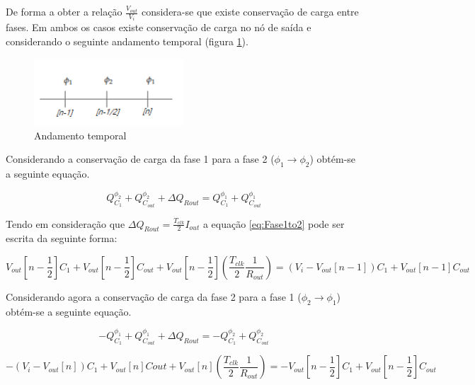 \documentclass[12pt]{article}
\begin{document}
De forma a obter a relação $\frac{V_{out}}{V_i}$ considera-se que existe conservação de carga entre fases. Em ambos os casos existe conservação de carga no nó de saída e considerando o seguinte andamento temporal (figura \ref{fig:Andamento temporal}).

\begin{figure}[h]
	\centering
	\includegraphics[height=2.5cm]{andamentotemporal}
	\caption{Andamento temporal}
	\label{fig:Andamento temporal}
\end{figure}
Considerando a conservação de carga da fase 1 para a fase 2 ($\phi_1 \rightarrow \phi_2$) obtém-se a seguinte equação.
\vspace{5mm}

\begin{equation}
\label{eq:Fase1to2}
Q^{\phi_2}_{C_1} + Q^{\phi_2}_{C_{out}} + \Delta Q_{Rout} = Q^{\phi_1}_{C_1} + Q^{\phi_1}_{C_{out}} 
\end{equation}
\vspace{5mm}

Tendo em consideração que $\Delta Q_{Rout} = \frac{T_{clk} }{2}I_{out}$ a equação \ref{eq:Fase1to2} pode ser escrita da seguinte forma:

\begin{equation}
\label{eq:Fase1to2s}
V_{out}[n-\frac{1}{2}]C_1 + V_{out}[n-\frac{1}{2}]C_{out} +  V_{out}[n-\frac{1}{2}](\frac{T_{clk} }{2}\frac{1}{R_{out}})=(V_i-V_{out}[n-1])C_1 + V_{out}[n-1]C_{out}
\end{equation}
\vspace{5mm}

Considerando agora a conservação de carga da fase 2 para a fase 1 ($\phi_2 \rightarrow \phi_1$) obtém-se a seguinte equação.

\begin{equation}
-Q^{\phi_1}_{C_1} + Q^{\phi_1}_{C_{out}} + \Delta Q_{Rout} = -Q^{\phi_2}_{C_1} + Q^{\phi_2}_{C_{out}}
\end{equation}

\begin{equation}
\label{eq:Fase2to1}
-(V_i-V_{out}[n])C_1+ V_{out}[n]C{out}+ V_{out}[n](\frac{T_{clk} }{2}\frac{1}{R_{out}}) = - V_{out}[n-\frac{1}{2}]C_1 + V_{out}[n-\frac{1}{2}]C_{out} 
\end{equation}
\vspace{5mm} 
\end{document}
